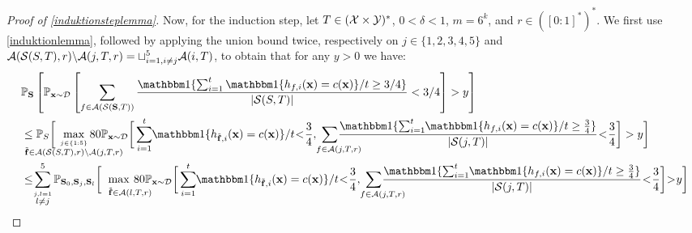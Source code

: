 \begin{proof}[Proof of \cref{induktionsteplemma}]
Now, for the induction step, let $T\in(\mathcal{X}\times\mathcal{Y})^{*}$, $0<\delta<1$, $m=6^{k}$, and $r\in([0:1]^{*})^{*}$. We first use \cref{induktionlemma}, followed by applying the union bound twice, respectively on $j\in\{1,2,3,4,5\}$ and $\mathcal{A}(\mathcal{S}(S,T),r) \backslash \mathcal{A}(j,T,r)=\sqcup_{i=1,i\not=j}^{5}\mathcal{A}(i,T)$, to obtain that for any $y>0$ we have:  
\begin{align}\label{highprobabilityeq7}
  &\p_{\rS}\left[   
    \p_{\rx\sim \cD} \left[  
      \sum_{f\in \cA(\cS(\rS,T))} \frac{\ind\{\sum_{i=1}^{t} \ind\{h_{f,i}(\rx)=c(\rx)\}/t\geq 3/4\}}{|\cS(S,T)|}
       <3/4\right]> y 
       \right]
    \\
    &\leq 
    \p_{S}\bigg[\negmedspace \negmedspace  \negmedspace   \negmedspace \negmedspace \negmedspace \negmedspace  \negmedspace   \negmedspace \negmedspace \negmedspace \negmedspace  \negmedspace     \max_{\stackrel{j\in\{ 1:5 \}}{\rf\in \cA(\cS(S,T),r) \backslash \cA(j,T,r)}} \negmedspace \negmedspace  \negmedspace \negmedspace \negmedspace \negmedspace \negmedspace  \negmedspace \negmedspace \negmedspace\negmedspace \negmedspace\negmedspace\negmedspace 80\p_{\rx\sim \cD}
    \bigg[\sum_{i=1}^{t}\negmedspace  \ind\{h_{\rf,i}(\rx)=c(\rx)\}/t\negmedspace <\negmedspace \frac{3}{4},\negmedspace
    \negmedspace \negmedspace  \negmedspace  \negmedspace \negmedspace  \negmedspace \negmedspace \sum_{\text{\quad\quad}f\in \cA(j,T,r)} \negmedspace \negmedspace \negmedspace \negmedspace\negmedspace \negmedspace  \negmedspace \negmedspace \negmedspace \negmedspace \frac{\ind\{\sum_{i=1}^{t}\negmedspace  \ind\{h_{f,i}(\rx)=c(\rx)\}/t\geq \frac{3}{4}\}}{|\cS(j,T)|}
    \negmedspace<\negmedspace\frac{3}{4}\bigg]> y
  \bigg]\nonumber
  \\
  &\leq\negmedspace
   \sum_{\stackrel{j,l=1}{l\not=j}}^{5}\p_{\rS_{0},\rS_{j},\rS_{l}}\bigg[ \negmedspace \negmedspace \negmedspace\negmedspace\negmedspace\negmedspace\negmedspace\max_{ \quad \quad\stackrel{}{\rf\in\cA(l,T,r)}} \negmedspace \negmedspace \negmedspace  \negmedspace\negmedspace\negmedspace\negmedspace  \negmedspace  80\p_{\rx\sim \cD}
   \bigg[ \sum_{i=1}^{t}\negmedspace  \ind\{h_{\rf,i}(\rx)=c(\rx)\}/t\negmedspace <\negmedspace \frac{3}{4},\negmedspace
   \negmedspace \negmedspace  \negmedspace  \negmedspace \negmedspace  \negmedspace \negmedspace \sum_{\text{\quad\quad}f\in \cA(j,T,r)} \negmedspace \negmedspace \negmedspace \negmedspace\negmedspace \negmedspace  \negmedspace \negmedspace \negmedspace \negmedspace \frac{\ind\{\sum_{i=1}^{t}\negmedspace  \ind\{h_{f,i}(\rx)=c(\rx)\}/t\geq \frac{3}{4}\}}{|\cS(j,T)|}
   \negmedspace<\negmedspace\frac{3}{4}\bigg]\negmedspace> \negmedspace y\bigg]\nonumber
  \end{align} 


\end{proof}
